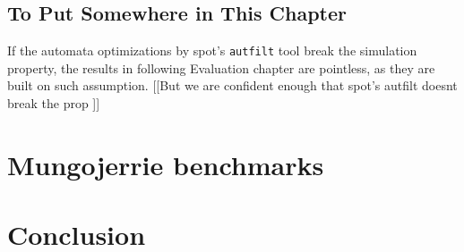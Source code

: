 \documentclass[
	digital
nolof, nolot
]{fithesis3}
\begin{document}
		\section{To Put Somewhere in This Chapter}
		If the automata optimizations by spot's 
		\texttt{autfilt} tool break the simulation property, the results in following Evaluation chapter are pointless, as they are built on such assumption. [[But we are confident enough that spot's autfilt doesnt break the prop ]]
	\chapter{Mungojerrie benchmarks}
	\chapter{Conclusion}
\end{document}
